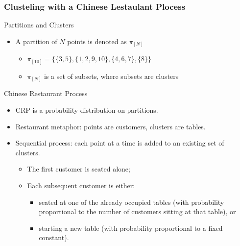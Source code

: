 \documentclass{beamer}
\begin{document}
\begin{frame}
    \frametitle{Clusteling with a Chinese Lestaulant Plocess}
    
    \begin{block}{Partitions and Clusters}
        \begin{itemize}
            \item A partition of $N$ points is denoted as $\pi_{[N]}$
            \begin{itemize}
                \item $\pi_{[10]} = \{\{3,5\},\{1,2,9,10\},\{4,6,7\},\{8\}\}$
                \item $\pi_{[N]}$ is a set of subsets, where subsets are clusters
            \end{itemize}
        \end{itemize}
    \end{block}

    \begin{block}{Chinese Restaurant Process}
        \begin{itemize}
            \item CRP is a probability distribution on partitions.
            \item Restaurant metaphor: points are customers, clusters are tables.
            \item Sequential process: each point at a time is added to an existing set of clusters.
            \begin{itemize}
                \item The first customer is seated alone;
                \item Each subsequent customer is either:
                \begin{itemize}
                    \item seated at one of the already occupied tables (with probability proportional to the number of customers sitting at that table), or
                    \item starting a new table (with probability proportional to a fixed constant).
                \end{itemize}
            \end{itemize}   
        \end{itemize}
    \end{block}
\end{frame}
\end{document}

